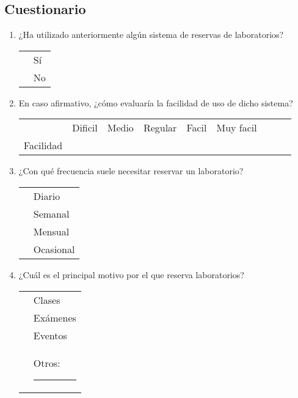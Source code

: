 \documentclass[12pt, a4paper]{article}
\newcommand{\checkbox}{\fbox{\rule{0pt}{1.5ex}\rule{1.5ex}{0pt}}}
\begin{document}
\subsection{Cuestionario}
\begin{enumerate}[label=\textbf{P\arabic*}.]

\item ¿Ha utilizado anteriormente algún sistema de reservas de laboratorios?  \\
        \begin{tabular}{ll}
        \checkbox & Sí \\
            \checkbox & No \\
            \end{tabular}

            \item En caso afirmativo, ¿cómo evaluaría la facilidad de uso de dicho sistema?  \\
                \begin{tabular}{ccccccccc}
                & Dificil & Medio & Regular & Facil & Muy facil \\
                    Facilidad & \checkbox & \checkbox & \checkbox & \checkbox & \checkbox \\
                    \end{tabular}

                    \item ¿Con qué frecuencia suele necesitar reservar un laboratorio?  \\
                        \begin{tabular}{ll}
                        \checkbox & Diario \\
                            \checkbox & Semanal \\
                            \checkbox & Mensual \\
                            \checkbox & Ocasional \\
                            \end{tabular}

                            \item ¿Cuál es el principal motivo por el que reserva laboratorios?  \\
                                \begin{tabular}{ll}
                                \checkbox & Clases \\
                                    \checkbox & Exámenes \\
                                    \checkbox & Eventos \\
                                    \checkbox & Otros: \rule{6cm}{0.3pt} \\
                                    \end{tabular}


\end{enumerate}
\end{document}

